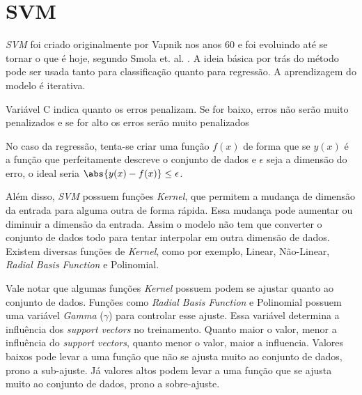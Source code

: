 

\section{\acrfull{SVM}}

\textit{\acrshort{SVM}} foi criado originalmente por Vapnik nos anos 60 e foi evoluindo até se tornar o que é hoje, segundo Smola et. al. \cite{Smola03atutorial}. A ideia básica por trás do método pode ser usada tanto para classificação quanto para regressão. A aprendizagem do modelo é iterativa.

Variável C indica quanto os erros penalizam. Se for baixo, erros não serão muito penalizados e se for alto os erros serão muito penalizados

No caso da regressão, tenta-se criar uma função \(f(x)\) de forma que se \(y(x)\) é a função que perfeitamente descreve o conjunto de dados e \(\epsilon\) seja a dimensão do erro, o ideal seria \(\abs{y(x) - f(x)} \leq \epsilon \).

Além disso, \textit{\acrshort{SVM}} possuem funções \textit{Kernel}, que permitem a mudança de dimensão da entrada para alguma outra de forma rápida. Essa mudança pode aumentar ou diminuir a dimensão da entrada. Assim o modelo não tem que converter o conjunto de dados todo para tentar interpolar em outra dimensão de dados. Existem diversas funções de \textit{Kernel}, como por exemplo, Linear, Não-Linear, \textit{Radial Basis Function} e Polinomial.

Vale notar que algumas funções \textit{Kernel} possuem podem se ajustar quanto ao conjunto de dados. Funções como \textit{Radial Basis Function} e Polinomial possuem uma variável \textit{Gamma} (\(\gamma\)) para controlar esse ajuste. Essa variável determina a influência dos \textit{support vectors} no treinamento. Quanto maior o valor, menor a influência do \textit{support vectors}, quanto menor o valor, maior a influencia. Valores baixos pode levar a uma função que não se ajusta muito ao conjunto de dados, prono a sub-ajuste. Já valores altos podem levar a uma função que se ajusta muito ao conjunto de dados, prono a sobre-ajuste.

